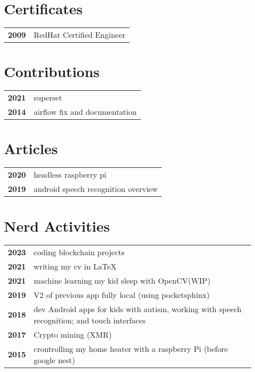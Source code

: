\documentclass[bluebeige]{hipstercv}
\begin{document}
\begin{paracol}{2}
\begin{minipage}[t]{0.16\textwidth}
 \hspace{1em}
\end{minipage}

\vspace{3em}

\begin{minipage}[t]{0.3\textwidth}
\section*{Certificates}
\begin{tabular}{>{\footnotesize\bfseries}r >{\footnotesize}p{}}
    2009 & RedHat Certified Engineer
\end{tabular}

\section*{Contributions}
\begin{tabular}{>{\footnotesize\bfseries}r >{\footnotesize}p{}}
	2021 & superset\\
	2014 & airflow fix and documentation
\end{tabular}

\section*{Articles}
\begin{tabular}{>{\footnotesize\bfseries}r >{\footnotesize}p{}}
	2020 & headless raspberry pi\\
	2019 & android speech recognition overview
\end{tabular}

\end{minipage}\hfill
\begin{minipage}[t]{0.3\textwidth}
\section*{Nerd Activities}
\begin{tabular}{>{\footnotesize\bfseries}r >{\footnotesize}p{}}
	2023 & coding blockchain projects\\
	2021 & writing my cv in \LaTeX\\
	2021 & machine learning my kid sleep with OpenCV(WIP)\\
	2019 & V2 of previous app fully local (using pocketsphinx)\\
    2018 & dev Android apps for kids with autism, working with speech recognition; and touch interfaces\\
	2017 & Crypto mining (XMR)\\
	2015 & crontrolling my home heater with a raspberry Pi (before google nest)
\end{tabular}


\end{minipage}
\end{paracol}
\end{document}
